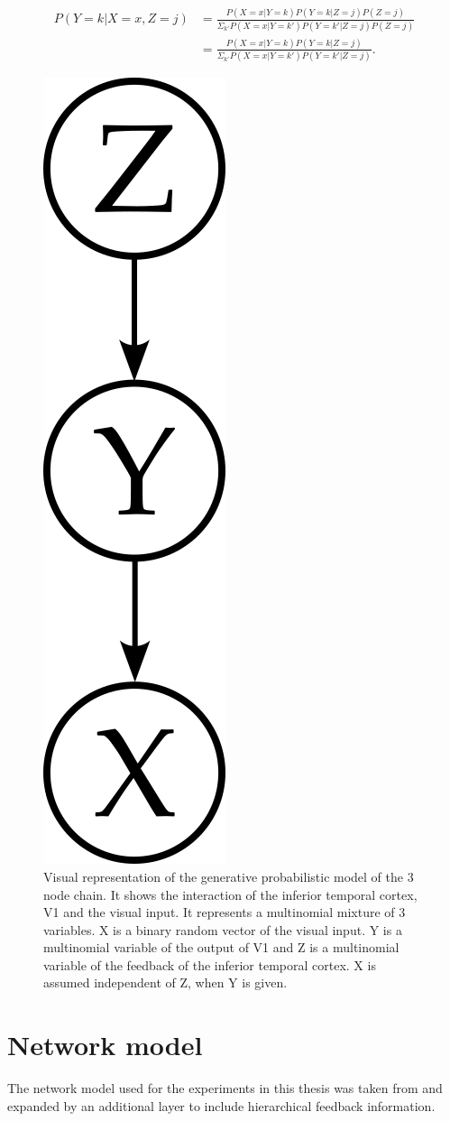 \begin{equation}
\label{eqn:pYvorausgesetztXUndZ}
\begin{split}
P(Y = k|X = x, Z = j) &= \frac{P(X=x|Y=k)P(Y = k|Z = j)P(Z = j)}{\Sigma_{k'}P(X=x|Y=k')P(Y=k'|Z=j)P(Z=j)}\\
&= \frac{P(X=x|Y=k)P(Y = k|Z = j)}{\Sigma_{k'}P(X=x|Y=k')P(Y=k'|Z=j)}.
\end{split}
\end{equation}

\begin{figure}
  \centering
  \label{fig:generativeModel}
  \includegraphics[width=0.075\linewidth]{figures/generativeModel.png}
  \caption{Visual representation of the generative probabilistic model of the 3 node chain. It shows the interaction of the inferior temporal cortex, V1 and the visual input. It represents a multinomial mixture of 3 variables. X is a binary random vector of the visual input. Y is a multinomial variable of the output of V1 and Z is a multinomial variable of the feedback of the inferior temporal cortex. X is assumed independent of Z, when Y is given.}
\end{figure}

\section{Network model}

The network model used for the experiments in this thesis was taken from \citet{nessler} and expanded by an additional layer to include hierarchical feedback information.

